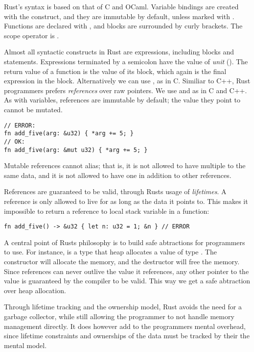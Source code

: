 \documentclass[a4paper,twoside]{report}
\begin{document}
Rust's syntax is based on that of C and OCaml.  Variable bindings are created
with the  construct, and they are immutable by default, unless marked
with .  Functions are declared with , and blocks are
surrounded by curly brackets.  The scope operator is \code{::}.

Almost all syntactic constructs in Rust are expressions, including blocks and
 statements.  Expressions terminated by a semicolon have the value of
\emph{unit} (\code{()}).  The return value of a function is the value of its
block, which again is the final expression in the block. Alternatively we can
use , as in C.  Similiar to C++, Rust programmers prefers
\emph{references} over raw pointers.  We use \code{\&} and \code{*} as in C and
C++.  As with variables, references are immutable by default; the value they
point to cannot be mutated.

\begin{lstlisting}[firstnumber=last]
// ERROR:
fn add_five(arg: &u32) { *arg += 5; }
// OK:
fn add_five(arg: &mut u32) { *arg += 5; }
\end{lstlisting}

Mutable references cannot alias; that is, it is not allowed to have multiple
 to the same data, and it is not allowed to have one 
in addition to other references.

References are guaranteed to be valid, through Rusts usage of
\emph{lifetimes}.  A reference is only allowed to live for as long as the data
it points to.  This makes it impossible to return a reference to local stack
variable in a function:
\begin{lstlisting}[firstnumber=last]
fn add_five() -> &u32 { let n: u32 = 1; &n } // ERROR
\end{lstlisting}

A central point of Rusts philosophy is to build safe abtractions for
programmers to use.  For instance,  is a type that heap
allocates a value of type .  The constructor will allocate the memory,
and the destructor will free the memory.  Since references can never outlive
the value it references, any other pointer to the value is guaranteed by the
compiler to be valid.  This way we get a safe abtraction over heap allocation.

Through lifetime tracking and the ownership model, Rust avoids the need for a
garbage collector, while still allowing the programmer to not handle memory
management directly. It does however add to the programmers mental overhead,
since lifetime constraints and ownerships of the data must be tracked by their
the mental model.
\end{document}
